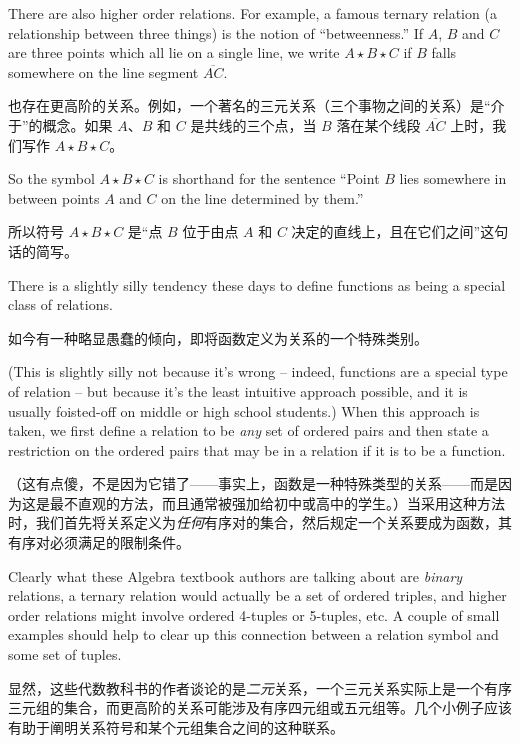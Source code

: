 There are also higher order
relations.  For example, a famous  ternary 
relation (a relationship between
three things) is the notion of ``betweenness.''  If $A$, $B$ and $C$ are
three points which all lie on a single line, we write $A\star B \star C$
if $B$ falls somewhere on the line segment $\overline{AC}$.

也存在更高阶的关系。例如，一个著名的三元关系（三个事物之间的关系）是“介于”的概念。如果 $A$、$B$ 和 $C$ 是共线的三个点，当 $B$ 落在某个线段 $\overline{AC}$ 上时，我们写作 $A\star B \star C$。

So the
symbol $A\star B \star C$ is shorthand for the sentence ``Point $B$ lies
somewhere in between points $A$ and $C$ on the line determined by them.''

所以符号 $A\star B \star C$ 是“点 $B$ 位于由点 $A$ 和 $C$ 决定的直线上，且在它们之间”这句话的简写。

There is a slightly silly tendency these days to define functions as being
a special class of relations.

如今有一种略显愚蠢的倾向，即将函数定义为关系的一个特殊类别。

(This is slightly silly not because it's wrong
-- indeed, functions are a special type of relation -- but because it's the 
least intuitive approach possible, and it is usually foisted-off on middle or
high school students.)  When this approach is taken, we first define
a relation to be \emph{any} set of ordered pairs and then state a 
restriction on the ordered pairs that may be in a relation if it 
is to be a function.

（这有点傻，不是因为它错了——事实上，函数是一种特殊类型的关系——而是因为这是最不直观的方法，而且通常被强加给初中或高中的学生。）当采用这种方法时，我们首先将关系定义为\emph{任何}有序对的集合，然后规定一个关系要成为函数，其有序对必须满足的限制条件。

Clearly what these Algebra textbook authors 
are talking about are \emph{binary} relations, a ternary relation 
would actually be a set of ordered triples, and higher order relations
might involve ordered 4-tuples or 5-tuples, etc.  A couple of small examples 
should help to clear up this connection between a relation symbol and 
some set of tuples.

显然，这些代数教科书的作者谈论的是\emph{二元}关系，一个三元关系实际上是一个有序三元组的集合，而更高阶的关系可能涉及有序四元组或五元组等。几个小例子应该有助于阐明关系符号和某个元组集合之间的这种联系。

